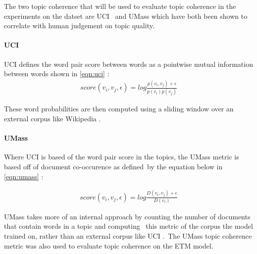 \documentclass[letterpaper,12pt]{article}
\begin{document}
The two topic coherence that will be used to evaluate topic coherence in the experiments on the datset are UCI \cite{newman2010automatic}\
and UMass \cite{mimno2011optimizing} which have both been shown to correlate with human judgement on topic quality.

\paragraph{UCI}
UCI defines the word pair score between words as a pointwise mutual information between words shown in \ref{eqn:uci} \cite{stevens2012exploring}:
\begin{eqnarray}
	\label{eqn:uci}
	score(v_i,v_j,\epsilon) = log \frac{p(v_i,v_j) + \epsilon}{p(v_i)p(v_j)}
\end{eqnarray}

These word probabilities are then computed using a sliding window over an external corpus like Wikipedia \cite{stevens2012exploring}.

\paragraph{UMass}
Where UCI is based of the word pair score in the topics, the UMass metric is based off of document co-occurence as defined\
by the equation below in \ref{eqn:umass} \cite{mimno2011optimizing}:

\begin{eqnarray}
	\label{eqn:umass}
	score(v_i,v_j,\epsilon) = log \frac{D(v_i,v_j) + \epsilon}{D(v_i)}
\end{eqnarray}

UMass takes more of an internal approach by counting the number of documents that contain words in a topic and computing \
this metric of the corpus the model trained on, rather than an external corpus like UCI \cite{stevens2012exploring}.\
The UMass topic coherence metric was also used to evaluate topic coherence on the ETM model.
\end{document}
